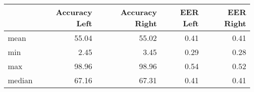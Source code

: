 \begin{tabular}{lrrrr}
\toprule
{} &  Accuracy Left &  Accuracy Right &  EER Left &  EER Right \\
\midrule
mean   &          55.04 &           55.02 &      0.41 &       0.41 \\
min    &           2.45 &            3.45 &      0.29 &       0.28 \\
max    &          98.96 &           98.96 &      0.54 &       0.52 \\
median &          67.16 &           67.31 &      0.41 &       0.41 \\
\bottomrule
\end{tabular}
